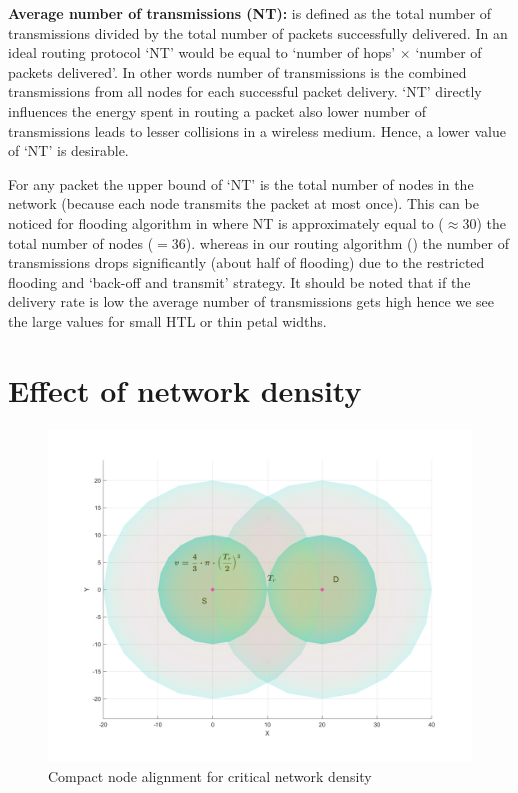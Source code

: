 \textbf{Average number of transmissions (NT):} is defined as the total number of transmissions divided by the total number of packets successfully delivered. In an ideal routing protocol `NT' would be equal to `number of hops' $\times$ `number of packets delivered'. In other words number of transmissions is the combined transmissions from all nodes for each successful packet delivery. `NT' directly influences the energy spent in routing a packet also lower number of transmissions leads to lesser collisions in a wireless medium. Hence, a lower value of `NT' is desirable. 

For any packet the upper bound of `NT' is the total number of nodes in the network (because each node transmits the packet at most once). This can be noticed for flooding algorithm in  where NT is approximately equal to ($ \approx 30$) the total number of nodes ($ = 36$). whereas in our routing algorithm () the number of transmissions drops significantly (about half of flooding) due to the restricted flooding and `back-off and transmit' strategy. It should be noted that if the delivery rate is low the average number of transmissions gets high hence we see the large values for small HTL or thin petal widths.

\section{Effect of network density}

\begin{figure}[hbtp]
\centering
\includegraphics[width=\simResultFigSize\textwidth]{ncsuthesis-0.6/Chapter-5/figs/nodeDensity}
\caption{Compact node alignment for critical network density}
\label{fig:node_density}
\end{figure}

